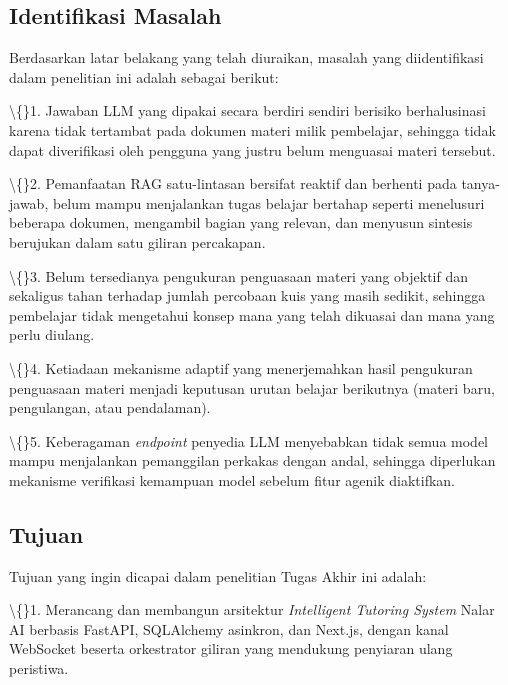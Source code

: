 \documentclass[12pt,a4paper]{article}
\begin{document}
\subsection*{Identifikasi Masalah}

Berdasarkan latar belakang yang telah diuraikan, masalah yang diidentifikasi dalam penelitian ini adalah sebagai berikut:



\textbackslash\{\}1. Jawaban LLM yang dipakai secara berdiri sendiri berisiko berhalusinasi karena tidak tertambat pada dokumen materi milik pembelajar, sehingga tidak dapat diverifikasi oleh pengguna yang justru belum menguasai materi tersebut.



\textbackslash\{\}2. Pemanfaatan RAG satu-lintasan bersifat reaktif dan berhenti pada tanya-jawab, belum mampu menjalankan tugas belajar bertahap seperti menelusuri beberapa dokumen, mengambil bagian yang relevan, dan menyusun sintesis berujukan dalam satu giliran percakapan.



\textbackslash\{\}3. Belum tersedianya pengukuran penguasaan materi yang objektif dan sekaligus tahan terhadap jumlah percobaan kuis yang masih sedikit, sehingga pembelajar tidak mengetahui konsep mana yang telah dikuasai dan mana yang perlu diulang.



\textbackslash\{\}4. Ketiadaan mekanisme adaptif yang menerjemahkan hasil pengukuran penguasaan materi menjadi keputusan urutan belajar berikutnya (materi baru, pengulangan, atau pendalaman).



\textbackslash\{\}5. Keberagaman \textit{endpoint} penyedia LLM menyebabkan tidak semua model mampu menjalankan pemanggilan perkakas dengan andal, sehingga diperlukan mekanisme verifikasi kemampuan model sebelum fitur agenik diaktifkan.



\subsection*{Tujuan}

Tujuan yang ingin dicapai dalam penelitian Tugas Akhir ini adalah:



\textbackslash\{\}1. Merancang dan membangun arsitektur \textit{Intelligent Tutoring System} Nalar AI berbasis FastAPI, SQLAlchemy asinkron, dan Next.js, dengan kanal WebSocket beserta orkestrator giliran yang mendukung penyiaran ulang peristiwa.
\end{document}
